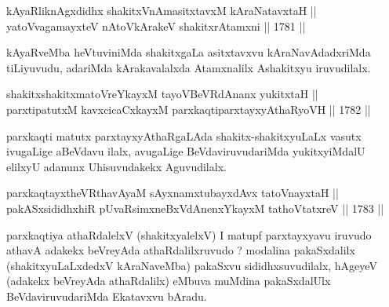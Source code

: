 
\begin{shl}
kAyaRliknAgxdidhx shakitxVnAmasitxtavxM kAraNatavxtaH || \\
yatoV\s vagamayxteV nAtoV\s kArakeV shakitxrAtamxni \hfill || 1781 ||  
\end{shl}

\begin{artha}
kAyaRveMba heVtuviniMda shakitxgaLa asitxtavxvu kAraNavAdadxriMda
tiLiyuvudu, adariMda kArakavalalxda Atamxnalilx Ashakitxyu iruvudilalx.
\end{artha}


\begin{shl}
shakitxshakitxmatoVreYkayxM tayoVBeVRdAnanx yukitxtaH || \\
parxtipatutxM kavxcicaCxkayxM \footnotemark[1]parxkaqtiparxtayxyAthaRyoVH \hfill || 1782 ||  
\end{shl}

\begin{artha}
parxkaqti matutx parxtayxyAthaRgaLAda
shakitx-shakitxyuLaLx vasutx ivugaLige aBeVdavu ilalx, avugaLige
BeVdaviruvudariMda yukitxyiMdalU elilxyU adanunx Uhisuvudakekx
Aguvudilalx.
\end{artha}


\begin{shl}
parxkaqtayxtheVR\s thavA\s yaM sAyxnamxtubayxdAvx tatoV\s nayxtaH ||  \\
pakASxsididhxhiR pUvaRsimxneBxVdAnenxYkayxM tathoVtatxreV \hfill || 1783 ||  
\end{shl}

\begin{artha}
parxkaqtiya athaRdalelxV (shakitxyalelxV) I matupf parxtayxyavu iruvudo
athavA adakekx beVreyAda athaRdalilxruvudo ? modalina pakaSxdalilx
(shakitxyuLaLxdedxV kAraNaveMba) pakaSxvu sididhxsuvudilalx, hAgeyeV
(adakekx beVreyAda athaRdalilx) eMbuva muMdina pakaSxdalUlx
BeVdaviruvudariMda Ekatavxvu bAradu.
\end{artha}

